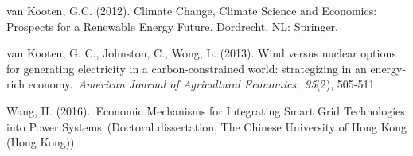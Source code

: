 \documentclass[10pt,letter]{article}
\begin{document}
van Kooten, G.C. (2012). Climate Change, Climate Science and Economics:
Prospects for a Renewable Energy Future. Dordrecht, NL: Springer.

van Kooten, G. C., Johnston, C., Wong, L. (2013). Wind versus nuclear
options for generating electricity in a carbon-constrained world:
strategizing in an energy-rich economy.~\emph{American Journal of
Agricultural Economics},~\emph{95}(2), 505-511.

Wang, H. (2016).~Economic Mechanisms for Integrating Smart Grid
Technologies into Power Systems~(Doctoral dissertation, The Chinese
University of Hong Kong (Hong Kong)).
\end{document}
